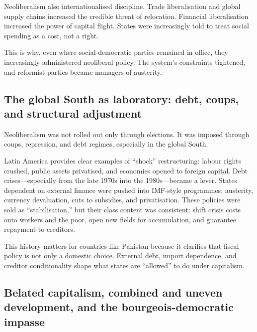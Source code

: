 Neoliberalism also internationalised discipline. Trade liberalisation and global supply chains increased the credible
threat of relocation. Financial liberalisation increased the power of capital flight. States were increasingly told to
treat social spending as a cost, not a right.

This is why, even where social-democratic parties remained in office, they increasingly administered neoliberal policy.
The system's constraints tightened, and reformist parties became managers of austerity.

\subsection{The global South as laboratory: debt, coups, and structural adjustment}
\label{subsec:global-south-laboratory}

Neoliberalism was not rolled out only through elections. It was imposed through coups, repression, and debt regimes,
especially in the global South.

Latin America provides clear examples of ``shock'' restructuring: labour rights crushed, public assets privatised,
and economies opened to foreign capital. Debt crises—especially from the late 1970s into the 1980s—became a lever.
States dependent on external finance were pushed into IMF-style programmes: austerity, currency devaluation,
cuts to subsidies, and privatisation.\cite{PeetUnholyTrinity} These policies were sold as ``stabilisation,'' but their class content was
consistent: shift crisis costs onto workers and the poor, open new fields for accumulation, and guarantee repayment
to creditors.

This history matters for countries like Pakistan because it clarifies that fiscal policy is not only a domestic choice.
External debt, import dependence, and creditor conditionality shape what states are ``allowed'' to do under capitalism.

\subsection{Belated capitalism, combined and uneven development, and the bourgeois-democratic impasse}
\label{subsec:combined-uneven}

